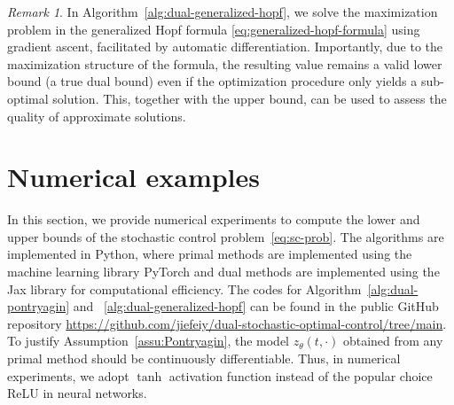 \documentclass[11pt]{article}
\numberwithin{equation}{section}
\theoremstyle{plain}
\theoremstyle{definition}
\theoremstyle{remark}
\newtheorem{remark}[theorem]{Remark}
\begin{document}
\begin{remark}
In Algorithm~\ref{alg:dual-generalized-hopf}, we solve the maximization problem in the generalized Hopf formula \eqref{eq:generalized-hopf-formula} using gradient ascent, facilitated by automatic differentiation. Importantly, due to the maximization structure of the formula, the resulting value remains a valid lower bound (a true dual bound) even if the optimization procedure only yields a sub-optimal solution. This, together with the upper bound, can be used to assess the quality of approximate solutions. 
\end{remark}

\section{Numerical examples}
\label{sec:numerical-examples}
In this section, we provide numerical experiments to compute the lower and upper bounds of the stochastic control problem~\eqref{eq:sc-prob}. The algorithms are implemented in Python, where primal methods are implemented using the machine learning library PyTorch and dual methods are implemented using the Jax library for computational efficiency. The codes for Algorithm~\ref{alg:dual-pontryagin} and ~\ref{alg:dual-generalized-hopf} can be found in the public GitHub repository \href{https://github.com/jiefeiy/dual-stochastic-optimal-control/tree/main}{https://github.com/jiefeiy/dual-stochastic-optimal-control/tree/main}. 
To justify Assumption~\ref{assu:Pontryagin}, the model $z_\theta(t,\cdot)$ obtained from any primal method should be continuously differentiable. Thus, in numerical experiments, we adopt $\tanh$ activation function instead of the popular choice \textrm{ReLU} in neural networks. 
\end{document}
